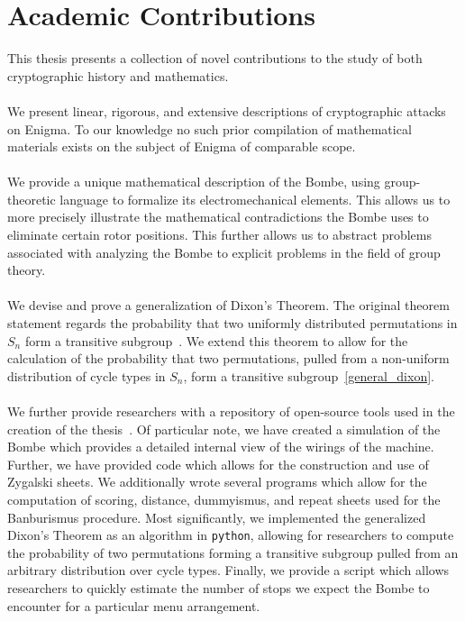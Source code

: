 \documentclass{dcthesis}
\theoremstyle{definition}
\theoremstyle{remark}
\begin{document}
\chapter*{Academic Contributions}
This thesis presents a collection of novel contributions to the study of both cryptographic history and mathematics. 
\\\\We present linear, rigorous, and extensive descriptions of cryptographic attacks on Enigma. To our knowledge no such prior compilation of mathematical materials exists on the subject of Enigma of comparable scope. 
\\\\We provide a unique mathematical description of the Bombe, using group-theoretic language to formalize its electromechanical elements. This allows us to more precisely illustrate the mathematical contradictions the Bombe uses to eliminate certain rotor positions. This further allows us to abstract problems associated with analyzing the Bombe to explicit problems in the field of group theory.
\\\\We devise and prove a generalization of Dixon's Theorem. The original theorem statement regards the probability that two uniformly distributed permutations in $S_n$ form a transitive subgroup~\cite{Dixon1969}. We extend this theorem to allow for the calculation of the probability that two permutations, pulled from a non-uniform distribution of cycle types in $S_n$, form a transitive subgroup~\ref{general_dixon}. 
\\\\We further provide researchers with a repository of open-source tools used in the creation of the thesis~\cite{Weinbaum2023_building-a-bombe}. Of particular note, we have created a simulation of the Bombe which provides a detailed internal view of the wirings of the machine. Further, we have provided code which allows for the construction and use of Zygalski sheets. We additionally wrote several programs which allow for the computation of scoring, distance, dummyismus, and repeat sheets used for the Banburismus procedure. Most significantly, we implemented the generalized Dixon's Theorem as an algorithm in \texttt{python}, allowing for researchers to compute the probability of two permutations forming a transitive subgroup pulled from an arbitrary distribution over cycle types. Finally, we provide a script which allows researchers to quickly estimate the number of stops we expect the Bombe to encounter for a particular menu arrangement.
\end{document}
